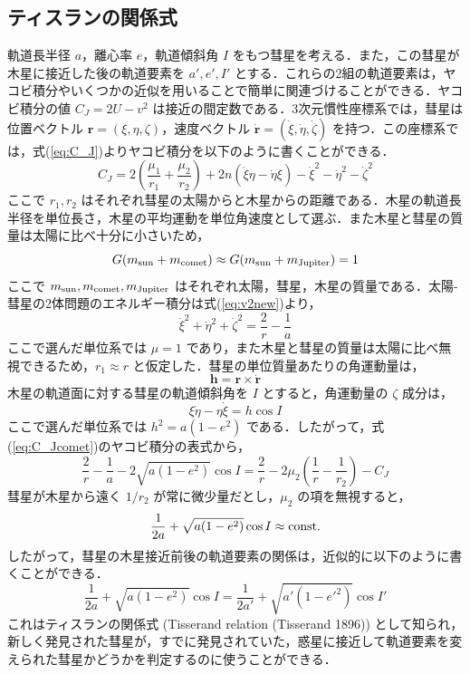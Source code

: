 \documentclass[11pt,a4paper,oneside,onecolumn]{jreport}
\begin{document}
\subsection{ティスランの関係式}
軌道長半径 $a$，離心率 $e$，軌道傾斜角 $I$ をもつ彗星を考える．また，この彗星が木星に接近した後の軌道要素を $a', e', I'$ とする．これらの2組の軌道要素は，ヤコビ積分やいくつかの近似を用いることで簡単に関連づけることができる．ヤコビ積分の値 $C_J = 2 U - v^2$ は接近の間定数である．3次元慣性座標系では，彗星は位置ベクトル ${\bm r} = (\xi, \eta, \zeta)$，速度ベクトル $\dot{{\bm r}} = (\dot{\xi}, \dot{\eta}, \dot{\zeta})$ を持つ．この座標系では，式(\ref{eq:C_J})よりヤコビ積分を以下のように書くことができる．
\begin{equation}
C_J = 2 \left( \frac{\mu_1}{r_1} + \frac{\mu_2}{r_2} \right) + 2 n (\dot{\xi} \eta - \dot{\eta} \xi) - \dot{\xi}^2 - \dot{\eta}^2 - \dot{\zeta}^2 \label{eq:C_Jcomet}
\end{equation}
ここで $r_1, r_2$ はそれぞれ彗星の太陽からと木星からの距離である．木星の軌道長半径を単位長さ，木星の平均運動を単位角速度として選ぶ．また木星と彗星の質量は太陽に比べ十分に小さいため，
\begin{equation}
G (m_{\rm sun} + m_{\rm comet}) \approx G (m_{\rm sun} + m_{\rm Jupiter}) = 1
\end{equation}
ここで $m_{\rm sun}, m_{\rm comet}, m_{\rm Jupiter}$ はそれぞれ太陽，彗星，木星の質量である．太陽-彗星の2体問題のエネルギー積分は式(\ref{eq:v2new})より，
\begin{equation}
\dot{\xi}^2 + \dot{\eta}^2 + \dot{\zeta}^2 = \frac{2}{r} - \frac{1}{a}
\end{equation}
ここで選んだ単位系では $\mu = 1$ であり，また木星と彗星の質量は太陽に比べ無視できるため，$r_1 \approx r$ と仮定した．彗星の単位質量あたりの角運動量は，
\begin{equation}
{\bm h} = {\bm r} \times \dot{{\bm r}}
\end{equation}
木星の軌道面に対する彗星の軌道傾斜角を $I$ とすると，角運動量の $\zeta$ 成分は，
\begin{equation}
\xi \dot{\eta} - \eta \dot{\xi} = h \cos I
\end{equation}
ここで選んだ単位系では $h^2 = a (1 - e^2)$ である．したがって，式(\ref{eq:C_Jcomet})のヤコビ積分の表式から，
\begin{equation}
\frac{2}{r} - \frac{1}{a} - 2 \sqrt{a (1 - e^2)} \cos I = \frac{2}{r} - 2 \mu_2 \left( \frac{1}{r} - \frac{1}{r_2} \right) - C_J
\end{equation}
彗星が木星から遠く $1/r_2$ が常に微少量だとし，$\mu_2$ の項を無視すると，
\begin{equation}
\frac{1}{2a} + \sqrt{a (1 - e^2)} \cos I \approx {\rm const.}
\end{equation}
したがって，彗星の木星接近前後の軌道要素の関係は，近似的に以下のように書くことができる．
\begin{equation}
\frac{1}{2a} + \sqrt{a (1 - e^2)} \cos I = \frac{1}{2a'} + \sqrt{a' (1 - e'^2)} \cos I'
\end{equation}
これはティスランの関係式 (Tisserand relation (Tisserand 1896)) として知られ，新しく発見された彗星が，すでに発見されていた，惑星に接近して軌道要素を変えられた彗星かどうかを判定するのに使うことができる．
\end{document}
